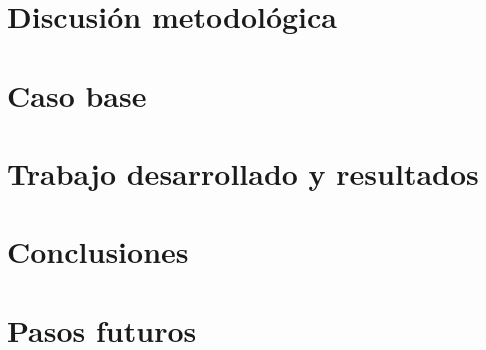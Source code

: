 \documentclass[pdftex]{pucthesis}
\begin{document}
\chapter[DISCUSIÓN METODOLÓGICA]{Discusión metodológica}\label{cap:metodologia}


\chapter[CASO BASE]{Caso base}\label{cap:casobase}


\chapter[TRABAJO DESARROLLADO Y RESULTADOS]{Trabajo desarrollado y resultados}\label{cap:trabajo}


\chapter[CONCLUSIONES]{Conclusiones}\label{cap:conclusiones}


\chapter[PASOS FUTUROS]{Pasos futuros}\label{cap:pasos}


\cleardoublepage
{}

\renewcommand{\bibname}{BIBLIOGRAFÍA}


\clearpage
\renewcommand{\appendixname}{APÉNDICE}
\appendix
\renewcommand{\theHfigure}{apendice.\Alph{figure}}

\end{document}
